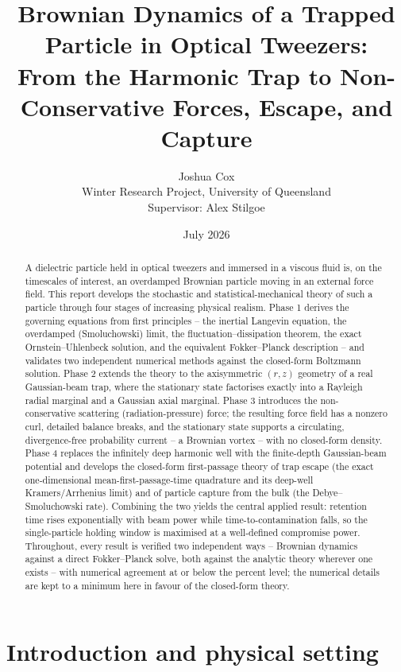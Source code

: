 \documentclass[11pt]{article}
\title{\Large Brownian Dynamics of a Trapped Particle in Optical Tweezers:\\[2pt]
\large From the Harmonic Trap to Non-Conservative Forces, Escape, and Capture}
\author{Joshua Cox\\[2pt]
\small Winter Research Project, University of Queensland\\
\small Supervisor: Alex Stilgoe}
\date{July 2026}
\begin{document}
\maketitle

\begin{abstract}
\noindent A dielectric particle held in optical tweezers and immersed in a viscous fluid is, on the timescales of interest, an overdamped Brownian particle moving in an external force field. This report develops the stochastic and statistical-mechanical theory of such a particle through four stages of increasing physical realism. Phase 1 derives the governing equations from first principles -- the inertial Langevin equation, the overdamped (Smoluchowski) limit, the fluctuation--dissipation theorem, the exact Ornstein--Uhlenbeck solution, and the equivalent Fokker--Planck description -- and validates two independent numerical methods against the closed-form Boltzmann solution. Phase 2 extends the theory to the axisymmetric $(r,z)$ geometry of a real Gaussian-beam trap, where the stationary state factorises exactly into a Rayleigh radial marginal and a Gaussian axial marginal. Phase 3 introduces the non-conservative scattering (radiation-pressure) force; the resulting force field has a nonzero curl, detailed balance breaks, and the stationary state supports a circulating, divergence-free probability current -- a Brownian vortex -- with no closed-form density. Phase 4 replaces the infinitely deep harmonic well with the finite-depth Gaussian-beam potential and develops the closed-form first-passage theory of trap escape (the exact one-dimensional mean-first-passage-time quadrature and its deep-well Kramers/Arrhenius limit) and of particle capture from the bulk (the Debye--Smoluchowski rate). Combining the two yields the central applied result: retention time rises exponentially with beam power while time-to-contamination falls, so the single-particle holding window is maximised at a well-defined compromise power. Throughout, every result is verified two independent ways -- Brownian dynamics against a direct Fokker--Planck solve, both against the analytic theory wherever one exists -- with numerical agreement at or below the percent level; the numerical details are kept to a minimum here in favour of the closed-form theory.
\end{abstract}

\tableofcontents

\section{Introduction and physical setting}
\end{document}

